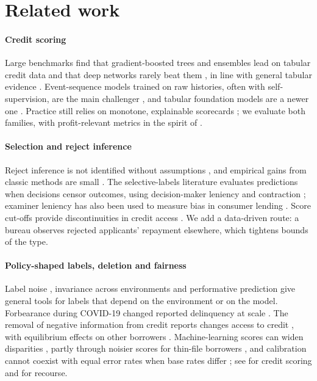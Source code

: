 \documentclass[10pt]{article}
\begin{document}
\section{Related work}\label{sec:related}

\paragraph{Credit scoring} Large benchmarks find that gradient-boosted trees and ensembles lead on tabular credit data \citep{lessmann2015} and that deep networks rarely beat them \citep{gunnarsson2021}, in line with general tabular evidence \citep{grinsztajn2022,gorishniy2021}. Event-sequence models trained on raw histories, often with self-supervision, are the main challenger \citep{babaev2019,babaev2022}, and tabular foundation models are a newer one \citep{hollmann2025}. Practice still relies on monotone, explainable scorecards \citep{siddiqi2017,thomas2017,rudin2019}; we evaluate both families, with profit-relevant metrics in the spirit of \citet{verbraken2014}.

\paragraph{Selection and reject inference} Reject inference is not identified without assumptions \citep{hand1993,hand1997}, and empirical gains from classic methods are small \citep{banasik2003,crook2004}. The selective-labels literature evaluates predictions when decisions censor outcomes, using decision-maker leniency and contraction \citep{lakkaraju2017,kleinberg2018}; examiner leniency has also been used to measure bias in consumer lending \citep{dobbie2021bias}. Score cut-offs provide discontinuities in credit access \citep{keys2010,agarwal2018}. We add a data-driven route: a bureau observes rejected applicants' repayment elsewhere, which tightens bounds of the \citet{manski1990} type.

\paragraph{Policy-shaped labels, deletion and fairness} Label noise \citep{natarajan2013}, invariance across environments \citep{arjovsky2019} and performative prediction \citep{perdomo2020} give general tools for labels that depend on the environment or on the model. Forbearance during COVID-19 changed reported delinquency at scale \citep{cherry2021}. The removal of negative information from credit reports changes access to credit \citep{musto2004,dobbie2020bad,herkenhoff2021}, with equilibrium effects on other borrowers \citep{liberman2018}. Machine-learning scores can widen disparities \citep{fuster2022}, partly through noisier scores for thin-file borrowers \citep{blattner2021}, and calibration cannot coexist with equal error rates when base rates differ \citep{kleinberg2017,chouldechova2017}; see \citet{kozodoi2022} for credit scoring and \citet{ustun2019} for recourse.
\end{document}
